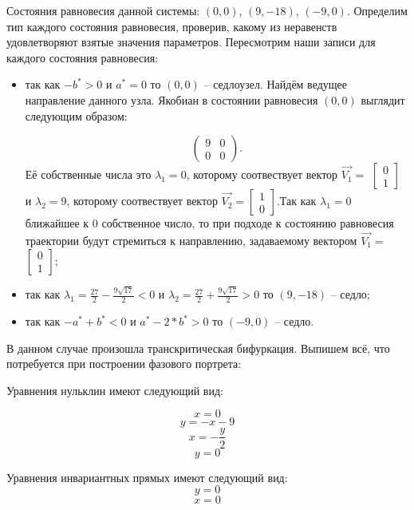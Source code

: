 Состояния равновесия данной системы: $(0, 0)$, $(9, -18)$, $(-9, 0)$. Определим тип каждого состояния равновесия, проверив, какому из неравенств удовлетворяют взятые значения параметров.  Пересмотрим наши записи для каждого состояния равновесия: 
\begin{itemize}
	\item{ так как $-b^\ast > 0 $ и $a^\ast = 0 $ то $(0, 0)$ -- седлоузел. Найдём ведущее направление данного узла. Якобиан в состоянии равновесия $(0, 0)$ выглядит следующим образом:
		
		$$\begin{pmatrix}9 & 0\\0 & 0\end{pmatrix}. $$Её собственные числа это $\lambda_1=0$, которому соотвествует вектор $\Vec{V_1}=$ $\left[\begin{matrix}0\\1\end{matrix}\right]$ и $\lambda_2=9$, которому соотвествует вектор $\Vec{V_2}=$$\left[\begin{matrix}1\\0\end{matrix}\right]$.Так как $\lambda_1=0$ ближайшее к $0$ собственное число, то при подходе к состоянию равновесия траектории будут стремиться к направлению, задаваемому вектором $\Vec{V_1}=$ $\left[\begin{matrix}0\\1\end{matrix}\right]$;}
	\item{ так как ${\lambda_{1}} = \frac{27}{2} - \frac{9 \sqrt{17}}{2}$$  < 0 $ и ${\lambda_{2}} = \frac{27}{2} + \frac{9 \sqrt{17}}{2}$$ > 0 $ то $(9, -18)$ -- седло;}
	\item{ так как $-a^\ast + b^\ast  < 0 $ и $a^\ast - 2*b^\ast > 0 $ то $(-9, 0)$ -- седло.}
\end{itemize} 

В данном случае произошла транскритическая бифуркация. Выпишем всё, что потребуется при построении фазового портрета:

Уравнения нульклин имеют следующий вид: 

$$x=0$$
$$y=- x - 9$$
$$x=- \frac{y}{2}$$
$$y=0$$


Уравнения инвариантных прямых имеют следующий вид: 
$$y = 0$$
$$x = 0$$

